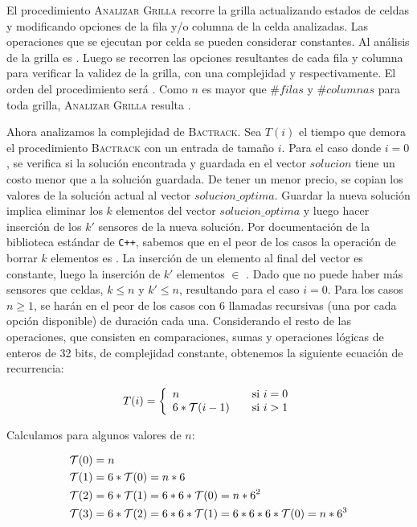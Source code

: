 \documentclass[11pt, a4paper, twoside]{article}
\begin{document}
El procedimiento \textsc{Analizar Grilla} recorre la grilla actualizando
estados de celdas y modificando opciones de la fila y/o columna de la celda analizadas.
Las operaciones que se ejecutan por celda se pueden considerar constantes.
Al análisis de la grilla es . Luego se recorren las opciones resultantes
de cada fila y columna para verificar la validez de la grilla, con una complejidad
 y  respectivamente. El orden del procedimiento
será . Como $n$ es mayor que
$\#filas$ y $\#columnas$ para toda grilla, \textsc{Analizar Grilla} resulta .

Ahora analizamos la complejidad de \textsc{Bactrack}. Sea $T(i)$ el tiempo que demora el procedimiento
\textsc{Bactrack} con un entrada de tamaño $i$. Para el caso donde $i = 0$,
se verifica si la solución encontrada y guardada en el vector $solucion$
tiene un costo menor que a la solución guardada. De tener un menor precio,
se copian los valores de la solución actual al vector $solucion\_optima$.{}
Guardar la nueva solución implica eliminar los $k$ elementos del vector $solucion\_optima${}
y luego hacer inserción de los $k'$ sensores de la nueva solución.
Por documentación de la biblioteca estándar de \texttt{C++}, sabemos que
en el peor de los casos la operación de borrar $k$ elementos es  .
La inserción de un elemento al final del vector es constante,
luego la inserción de $k'$ elementos $\in$ . Dado que no puede haber
más sensores que celdas, $k \leq n$ y $k' \leq n$, resultando  para el caso $i = 0$.
Para los casos $n \geq 1$, se harán en el peor de los casos con 6 llamadas recursivas
(una por cada opción disponible) de duración  cada una.
Considerando el resto de las operaciones, que consisten en comparaciones, sumas y
operaciones lógicas de enteros de 32 bits, de complejidad constante,
obtenemos la siguiente ecuación de recurrencia:

\begin{equation*}
	T(i) = \left\{
  \begin{array}{l l}
    n 					 & \quad \text{si } i = 0 \\
    6 * \mathop{}\mathopen{}\mathcal{T}\mathopen{}\left(i-1\right) & \quad \text{si } i > 1
  \end{array} \right.
\end{equation*}

Calculamos  para algunos valores de $n$:

\begin{align*}
	\mathop{}\mathopen{}\mathcal{T}\mathopen{}\left(0\right) &= n \\
	\mathop{}\mathopen{}\mathcal{T}\mathopen{}\left(1\right) &= 6 * \mathop{}\mathopen{}\mathcal{T}\mathopen{}\left(0\right) = n * 6 \\
	\mathop{}\mathopen{}\mathcal{T}\mathopen{}\left(2\right) &= 6 * \mathop{}\mathopen{}\mathcal{T}\mathopen{}\left(1\right) = 6 * 6 * \mathop{}\mathopen{}\mathcal{T}\mathopen{}\left(0\right) = n * 6^{2} \\
	\mathop{}\mathopen{}\mathcal{T}\mathopen{}\left(3\right) &= 6 * \mathop{}\mathopen{}\mathcal{T}\mathopen{}\left(2\right) = 6 * 6 * \mathop{}\mathopen{}\mathcal{T}\mathopen{}\left(1\right) = 6 * 6 * 6 * \mathop{}\mathopen{}\mathcal{T}\mathopen{}\left(0\right) = n * 6^{3} \\
\end{align*}
\end{document}
